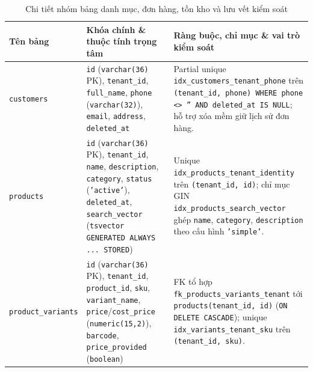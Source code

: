 \begin{table}[htbp]
  \centering
  \footnotesize
  \setlength{\tabcolsep}{4pt}
  \renewcommand{\arraystretch}{1.12}
  \caption{Chi tiết nhóm bảng danh mục, đơn hàng, tồn kho và lưu vết kiểm soát}\label{tab:schema}
  \begin{tabularx}{\linewidth}{@{}
    >{\raggedright\arraybackslash}p{3.1cm}
    >{\raggedright\arraybackslash}p{5.5cm}
    >{\raggedright\arraybackslash}X@{}}
    \toprule
    Tên bảng & Khóa chính \& thuộc tính trọng tâm & Ràng buộc, chỉ mục \& vai trò kiểm soát \\
    \midrule
    \texttt{customers} &
    \texttt{id} (\texttt{varchar(36)} PK), \texttt{tenant\_id}, \texttt{full\_name}, \texttt{phone} (\texttt{varchar(32)}), \texttt{email}, \texttt{address}, \texttt{deleted\_at} &
    Partial unique \texttt{idx\_\hspace{0pt}customers\_\hspace{0pt}tenant\_\hspace{0pt}phone} trên \texttt{(tenant\_id, phone) WHERE phone <> '' AND deleted\_at IS NULL}; hỗ trợ xóa mềm giữ lịch sử đơn hàng. \\
    \texttt{products} &
    \texttt{id} (\texttt{varchar(36)} PK), \texttt{tenant\_id}, \texttt{name}, \texttt{description}, \texttt{category}, \texttt{status} (\texttt{'active'}), \texttt{deleted\_at}, \texttt{search\_vector} (\texttt{tsvector} \texttt{GENERATED ALWAYS ... STORED}) &
    Unique \texttt{idx\_\hspace{0pt}products\_\hspace{0pt}tenant\_\hspace{0pt}identity} trên \texttt{(tenant\_id, id)}; chỉ mục GIN \texttt{idx\_\hspace{0pt}products\_\hspace{0pt}search\_\hspace{0pt}vector} ghép \texttt{name}, \texttt{category}, \texttt{description} theo cấu hình \texttt{'simple'}. \\
    \texttt{product\_\hspace{0pt}variants} &
    \texttt{id} (\texttt{varchar(36)} PK), \texttt{tenant\_id}, \texttt{product\_id}, \texttt{sku}, \texttt{variant\_name}, \texttt{price}/\hspace{0pt}\texttt{cost\_price} (\texttt{numeric(15,2)}), \texttt{barcode}, \texttt{price\_provided} (\texttt{boolean}) &
    FK tổ hợp \texttt{fk\_\hspace{0pt}products\_\hspace{0pt}variants\_\hspace{0pt}tenant} tới \texttt{products(tenant\_id, id)} (\texttt{ON DELETE CASCADE}); unique \texttt{idx\_\hspace{0pt}variants\_\hspace{0pt}tenant\_\hspace{0pt}sku} trên \texttt{(tenant\_id, sku)}. \\

\end{tabularx}
\end{table}
